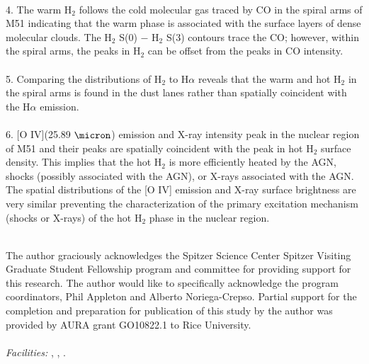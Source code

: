 \documentclass[12pt,preprint]{aastex}
\begin{document}
\\
4. The warm H$_2$ follows the cold molecular gas traced by CO 
in the spiral arms of M51 indicating that the warm phase is associated 
with the surface layers of dense molecular clouds.  The H$_2$ S(0) $-$
H$_2$ S(3) contours trace the CO; however, within the spiral
arms, the peaks in H$_2$ can be offset from the peaks in CO
intensity.\\
\\
5.  Comparing the distributions of H$_2$ to H$\alpha$ reveals
that the warm and hot H$_2$ in the spiral arms is found in the dust lanes
rather than spatially coincident with the H$\alpha$ emission.\\
\\
6.  [O IV](25.89 $\micron$) emission and X-ray
intensity peak in the nuclear region of M51 and their 
peaks are spatially coincident with the peak in hot H$_2$ 
surface density.  This implies that the hot H$_2$ 
is more efficiently heated by the AGN, shocks (possibly associated
with the AGN), or X-rays associated with the AGN.  The spatial
distributions of the [O IV] emission and X-ray surface brightness are
very similar preventing the characterization of the primary excitation 
mechanism (shocks or X-rays) of the hot H$_2$ phase in the nuclear region.\\ 
\\

\acknowledgments

The author graciously acknowledges the Spitzer Science Center Spitzer
Visiting Graduate Student Fellowship program and committee for
providing support for this research.  The author would like to
specifically acknowledge the program coordinators, Phil Appleton and
Alberto Noriega-Crepso. 
Partial support for the completion and preparation for publication of this study by the
author was provided by AURA grant GO10822.1 to Rice
University.\\ 
\\
{\it Facilities:} , ,
.
\end{document}
